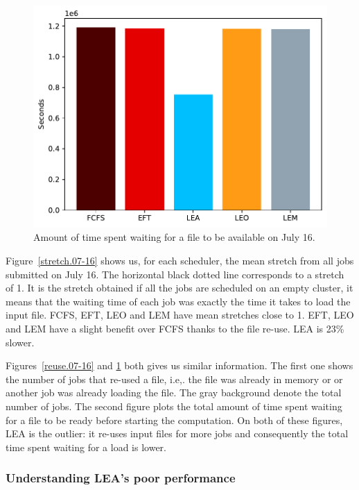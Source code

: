 \documentclass[conference,10pt]{IEEEtran}
\begin{document}
\begin{figure}[tb]\centering\includegraphics[scale=0.41]{../MBSS/plot/Results_FCFS_Score_Backfill_2022-07-16->2022-07-16_V10000_Total_waiting_for_a_load_time_and_transfer_time_450_128_32_256_4_1024.pdf}\caption{Amount of time spent waiting for a file to be available on July 16.}\label{load.07-16}\end{figure}

Figure~\ref{stretch.07-16} shows us, for each scheduler, the mean stretch from all jobs
submitted on July 16.
The horizontal black dotted line corresponds to a stretch of 1.
It is the stretch obtained if all the jobs 
are scheduled on an empty cluster, it means that the waiting time of each job was exactly
the time it takes to load the input file.
FCFS, EFT, LEO and LEM have mean stretches close to 1.
EFT, LEO and LEM have a slight benefit over FCFS thanks to the file re-use.
LEA is 23\% slower.

Figures~\ref{reuse.07-16} and \ref{load.07-16}
both gives us similar information. The first one 
shows the number of jobs that re-used a file,
i.e,. the file was already in memory or 
or another job was already loading the file.
The gray background denote the total
number of jobs.
The second figure plots the total amount of time spent 
waiting for a file to be ready before starting the computation.
On both of these figures, LEA is the outlier:
it re-uses input files for more jobs and consequently the total time spent waiting for a load is lower.

\subsubsection{Understanding LEA's poor performance}
\end{document}
